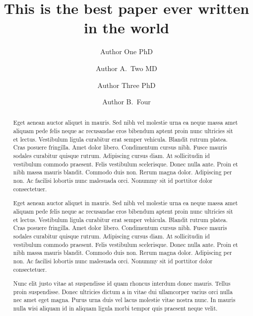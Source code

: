 \documentclass[alpha-refs,serif]{ecotropicos-article}
\title{This is the best paper ever written in the world}
\author[1\authfn{1}]{Author One PhD
	\href{http://orcid.org/0000-0000-0000-0000}
    {\textcolor{orcidlogocol}{\aiOrcid}}}
\author[2\authfn{1}]{Author A.~Two MD}
\author[2\authfn{2}]{Author Three PhD}
\author[2]{Author B.~Four}
\affil[1]{Department, Institution, City, State or Province, Postal Code, Country}
\affil[2]{Department, Institution, City, State or Province, Postal Code, Country}
\begin{document}
\maketitle
\begin{abstract}


\hspace{1.5em} 

Eget aenean auctor aliquet in mauris. Sed nibh vel molestie urna ea neque massa amet aliquam pede felis neque ac recusandae eros bibendum aptent proin nunc ultricies sit et lectus. Vestibulum ligula curabitur erat semper vehicula. Blandit rutrum platea. Cras posuere fringilla. Amet dolor libero. Condimentum cursus nibh. Fusce mauris sodales curabitur quisque rutrum. Adipiscing cursus diam. At sollicitudin id vestibulum commodo praesent. Felis vestibulum scelerisque. Donec nulla ante. Proin et nibh massa mauris blandit. Commodo duis non. Rerum magna dolor. Adipiscing per non. Ac facilisi lobortis nunc malesuada orci. Nonummy sit id porttitor dolor consectetuer. 

Eget aenean auctor aliquet in mauris. Sed nibh vel molestie urna ea neque massa amet aliquam pede felis neque ac recusandae eros bibendum aptent proin nunc ultricies sit et lectus. Vestibulum ligula curabitur erat semper vehicula. Blandit rutrum platea. Cras posuere fringilla. Amet dolor libero. Condimentum cursus nibh. Fusce mauris sodales curabitur quisque rutrum. Adipiscing cursus diam. At sollicitudin id vestibulum commodo praesent. Felis vestibulum scelerisque. Donec nulla ante. Proin et nibh massa mauris blandit. Commodo duis non. Rerum magna dolor. Adipiscing per non. Ac facilisi lobortis nunc malesuada orci. Nonummy sit id porttitor dolor consectetuer. 

Nunc elit justo vitae at suspendisse id quam rhoncus interdum donec mauris. Tellus proin suspendisse. Donec ultricies dictum a in vitae dui ullamcorper varius orci nulla nec amet eget magna. Purus urna duis vel lacus molestie vitae nostra nunc. In mauris nulla wisi aliquam id in aliquam ligula morbi tempor quis praesent neque velit.

\end{abstract}
\vspace{-2em}
\end{document}
